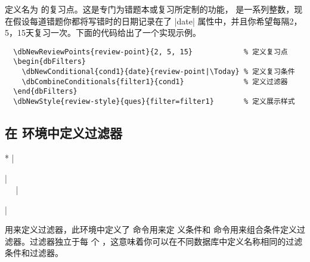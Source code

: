 \documentclass[full]{l3doc}
\begin{document}
\begin{documentation}
\begin{function}{\dbNewReviewPoints}
  \begin{syntax}
      
  \end{syntax}

  定义名为  的复习点。这是专门为错题本或复习所定制的功能，
  是一系列整数，现在假设每道错题你都将写错时的日期记录在了 |date|
  属性中，并且你希望每隔2，5，15天复习一次。下面的代码给出了一个实现示例。
\begin{verbatim}
  \dbNewReviewPoints{review-point}{2, 5, 15}            % 定义复习点
  \begin{dbFilters}
    \dbNewConditional{cond1}{date}{review-point|\Today} % 定义复习条件
    \dbCombineConditionals{filter1}{cond1}              % 定义过滤器
  \end{dbFilters}
  \dbNewStyle{review-style}{ques}{filter=filter1}       % 定义展示样式
\end{verbatim}
\end{function}

\subsection{在  环境中定义过滤器}

\noindent{}
\begin{Syntax}*
  |\begin{dbFilters}| \\
  ~~
  |\end{dbFilters}| \\
\end{Syntax}

用来定义过滤器，此环境中定义了  命令用来定
义条件和  命令用来组合条件定义过滤器。过滤器独立于每
个 ，这意味着你可以在不同数据库中定义名称相同的过滤条件和过滤器。


\end{documentation}
\end{document}
